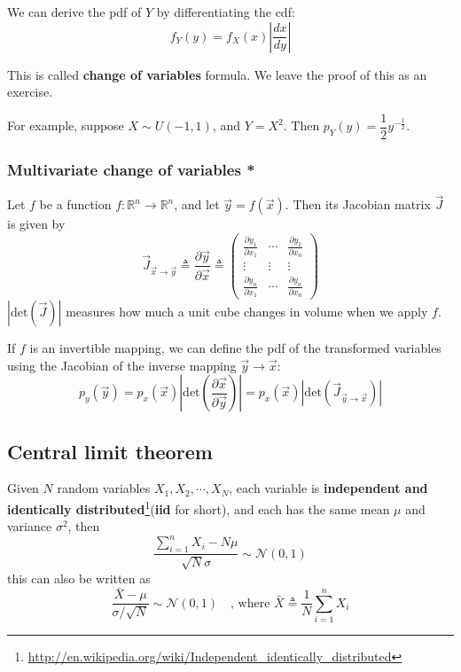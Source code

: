 \documentclass[graybox, envcountchap, twocolumn]{styles/svmult}
\begin{document}
We can derive the pdf of $Y$ by differentiating the cdf:
\begin{equation}\label{eqn:General-transformations}
f_Y(y)=f_X(x)|\dfrac{dx}{dy}|
\end{equation}

This is called \textbf{change of variables} formula. We leave the proof of this as an exercise. 

For example, suppose $X \sim U(−1,1)$, and $Y=X^2$. Then $p_Y(y)=\dfrac{1}{2}y^{-\frac{1}{2}}$.


\subsubsection{Multivariate change of variables *}
Let $f$ be a function $f:\mathbb{R}^n \rightarrow \mathbb{R}^n$, and let $\vec{y}=f(\vec{x})$. Then its Jacobian matrix $\vec{J}$ is given by
\begin{equation}
\vec{J}_{\vec{x} \rightarrow \vec{y}} \triangleq \frac{\partial \vec{y}}{\partial \vec{x}} \triangleq \left(\begin{array}{ccc}
\frac{\partial y_1}{\partial x_1} & \cdots & \frac{\partial y_1}{\partial x_n} \\
\vdots & \vdots & \vdots \\
\frac{\partial y_n}{\partial x_1} & \cdots & \frac{\partial y_n}{\partial x_n}
\end{array}\right)
\end{equation}
$|\mathrm{det}(\vec{J})|$ measures how much a unit cube changes in volume when we apply $f$.

If $f$ is an invertible mapping, we can define the pdf of the transformed variables using the Jacobian of the inverse mapping $\vec{y} \rightarrow \vec{x}$:
\begin{equation}\label{eqn:Multivariate-transformation}
p_y(\vec{y})=p_x(\vec{x})|\mathrm{det}(\frac{\partial \vec{x}}{\partial \vec{y}})|=p_x(\vec{x})|\mathrm{det}(\vec{J}_{\vec{y} \rightarrow \vec{x}})|
\end{equation}


\subsection{Central limit theorem}
Given $N$ random variables $X_1,X_2,\cdots,X_N$, each variable is \textbf{independent and identically distributed}\footnote{\url{http://en.wikipedia.org/wiki/Independent_identically_distributed}}(\textbf{iid} for short), and each has the same mean $\mu$ and variance $\sigma^2$, then
\begin{equation}
\dfrac{\sum\limits_{i=1}^n X_i-N\mu}{\sqrt{N}\sigma} \sim \mathcal{N}(0,1)
\end{equation}
this can also be written as
\begin{equation}
\dfrac{\bar{X}-\mu}{\sigma/\sqrt{N}} \sim \mathcal{N}(0,1) \quad \text{, where } \bar{X} \triangleq \dfrac{1}{N}\sum\limits_{i=1}^n X_i
\end{equation}
\end{document}
